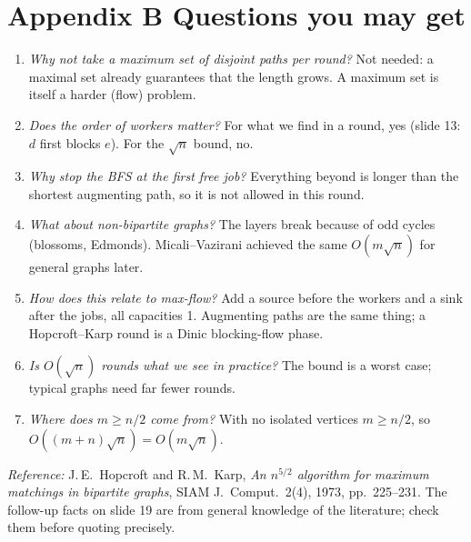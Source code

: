 \documentclass[11pt,a4paper]{article}
\begin{document}
\section*{Appendix B \quad Questions you may get}
\begin{enumerate}[label=\textbf{Q\arabic*.},leftmargin=2.4em,itemsep=5pt]
\item \emph{Why not take a \emph{maximum} set of disjoint paths per round?} Not needed: a maximal set already guarantees that the length grows. A maximum set is itself a harder (flow) problem.
\item \emph{Does the order of workers matter?} For what we find in a round, yes (slide 13: $d$ first blocks $e$). For the $\sqrt n$ bound, no.
\item \emph{Why stop the BFS at the first free job?} Everything beyond is longer than the shortest augmenting path, so it is not allowed in this round.
\item \emph{What about non-bipartite graphs?} The layers break because of odd cycles (blossoms, Edmonds). Micali--Vazirani achieved the same $O(m\sqrt n)$ for general graphs later.
\item \emph{How does this relate to max-flow?} Add a source before the workers and a sink after the jobs, all capacities 1. Augmenting paths are the same thing; a Hopcroft--Karp round is a Dinic blocking-flow phase.
\item \emph{Is $O(\sqrt n)$ rounds what we see in practice?} The bound is a worst case; typical graphs need far fewer rounds.
\item \emph{Where does $m\ge n/2$ come from?} With no isolated vertices $m\ge n/2$, so $O((m+n)\sqrt n)=O(m\sqrt n)$.
\end{enumerate}

\vfill
\small\textit{Reference:} J.\,E.\ Hopcroft and R.\,M.\ Karp, \emph{An $n^{5/2}$ algorithm for maximum matchings in bipartite graphs}, SIAM J.\ Comput.\ 2(4), 1973, pp.\ 225--231. The follow-up facts on slide 19 are from general knowledge of the literature; check them before quoting precisely.
\end{document}
